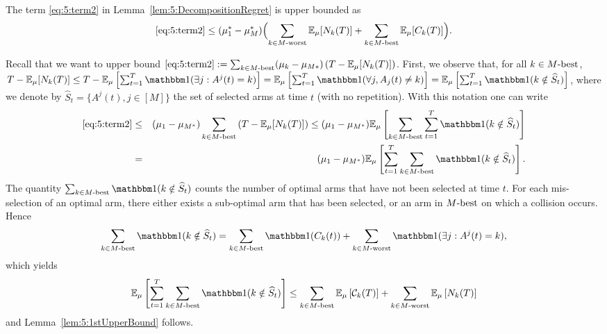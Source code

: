 \begin{lemma}\label{lem:5:1stUpperBound}
\begin{leftbar}[lemmabar]  %
  The term \ref{eq:5:term2} in Lemma~\ref{lem:5:DecompositionRegret} is upper bounded as
  \begin{equation}\label{eq:5:1stUpperBound}
    \ref{eq:5:term2} \leq (\mu_1^* - \mu_M^*) \Bigl(    \sum_{k \in M\text{-}\mathrm{worst}} \mathbb{E}_{\mu}[N_k(T)]
    + \sum_{k \in M\text{-}\mathrm{best}} \mathbb{E}_{\mu}[C_{k}(T)]
    \Bigr).
  \end{equation}
\end{leftbar}  %
\end{lemma}

\begin{smallproof}
  Recall that we want to upper bound
  $ \ref{eq:5:term2} : = \sum_{k \in M\text{-}\mathrm{best}} (\mu_k - \mu_{M*}) \left(T - \mathbb{E}_{\mu}[N_k(T)]\right)$.
  First, we observe that, for all $k\in M\text{-}\mathrm{best}$,
    $T - \E_{\mu}[N_k(T)] \leq T - \E_{\mu}\left[\sum_{t=1}^T \indic(\exists j : A^j(t) = k)\right] = \E_{\mu}\left[\sum_{t=1}^T \indic(\forall j, A_j(t) \neq k)\right] = \E_{\mu}\left[\sum_{t=1}^T \indic(k \notin \widehat{S}_t)\right]$,
  where we denote by $\widehat{S}_t = \{A^j(t), j \in [M]\}$ the set of selected arms at time $t$ (with no repetition). With this notation one can write
  \begin{eqnarray*}
  \ref{eq:5:term2} & \leq & (\mu_1 - \mu_{M^*})  \sum_{k \in \Mbest} \left(T - \E_{\mu}[N_k(T)]\right) \leq  (\mu_1 - \mu_{M^*})  \E_{\mu}\left[\sum_{k \in \Mbest} \sum_{t = 1}^T \indic(k \notin \widehat{S}_t)\right] \\
  & = &  (\mu_1 - \mu_{M^*})  \E_{\mu}\left[ \sum_{t = 1}^T \sum_{k \in \Mbest}\indic(k \notin \widehat{S}_t)\right].
  \end{eqnarray*}
  The quantity $\sum_{k \in \Mbest}\indic(k \notin \widehat{S}_t)$ counts the number of optimal arms that have not been selected at time $t$. For each mis-selection of an optimal arm, there either exists a sub-optimal arm that has been selected, or an arm in $M\text{-}\mathrm{best}$ on which a collision occurs. Hence
  \[\sum_{k \in \Mbest}\indic(k \notin \widehat{S}_t) = \sum_{k \in \Mbest}\indic(C_k(t)) + \sum_{k \in \Mworst} \indic(\exists j : A^j(t) = k),\]
  which yields
  \[\E_{\mu}\left[ \sum_{t = 1}^T \sum_{k \in \Mbest}\indic(k \notin \widehat{S}_t)\right] \leq \sum_{k \in \Mbest}\E_{\mu}\left[\cC_k(T)\right] + \sum_{k \in \Mworst} \E_{\mu}\left[N_k(T)\right]\]
  and Lemma~\ref{lem:5:1stUpperBound} follows.
\end{smallproof}



